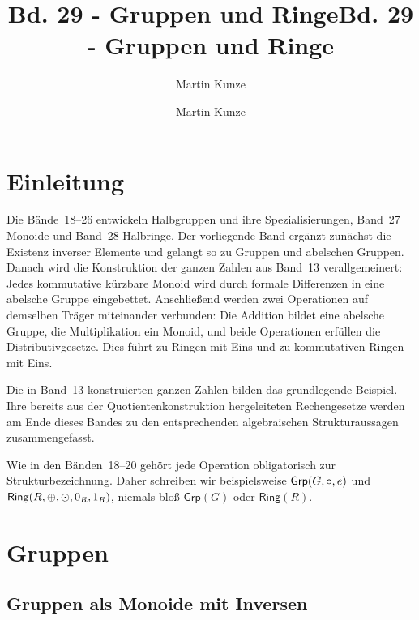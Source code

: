 \documentclass[main.tex]{subfiles}
\title{Bd. 29 - Gruppen und Ringe}
\author{Martin Kunze}
\date{}
\begin{document}
\newcommand{\BandXXIXProofRefStack}[1]{%
  \ensuremath{\begin{gathered}#1\end{gathered}}}

\title{Bd. 29 - Gruppen und Ringe}
\author{Martin Kunze}
\date{}
\hypersetup{pageanchor=false}
\maketitle
\hypersetup{pageanchor=true}
\setcounter{tocdepth}{3}
\tableofcontents
\setcounter{file}{29}
\renewcommand{\FormulaBandID}{29}

\chapter{Einleitung}

Die Bände~18--26 entwickeln Halbgruppen und ihre Spezialisierungen,
Band~27 Monoide und Band~28 Halbringe.
Der vorliegende Band ergänzt zunächst die Existenz inverser Elemente und
gelangt so zu Gruppen und abelschen Gruppen. Danach wird die Konstruktion
der ganzen Zahlen aus Band~13 verallgemeinert: Jedes kommutative kürzbare
Monoid wird durch formale Differenzen in eine abelsche Gruppe eingebettet.
Anschließend werden zwei Operationen auf demselben Träger miteinander
verbunden: Die Addition bildet eine abelsche Gruppe, die Multiplikation ein
Monoid, und beide Operationen erfüllen die Distributivgesetze. Dies führt zu
Ringen mit Eins und zu kommutativen Ringen mit Eins.

Die in Band~13 konstruierten ganzen Zahlen bilden das grundlegende Beispiel.
Ihre bereits aus der Quotientenkonstruktion hergeleiteten Rechengesetze
werden am Ende dieses Bandes zu den entsprechenden algebraischen
Strukturaussagen zusammengefasst.

Wie in den Bänden~18--20 gehört jede Operation obligatorisch zur
Strukturbezeichnung. Daher schreiben wir beispielsweise
\(\mathsf{Grp}\!\left(G,\circ,e\right)\) und
\(\mathsf{Ring}\!\left(R,\oplus,\odot,0_R,1_R\right)\), niemals bloß
\(\mathsf{Grp}(G)\) oder \(\mathsf{Ring}(R)\).

\chapter{Gruppen}

\section{Gruppen als Monoide mit Inversen}
\end{document}
